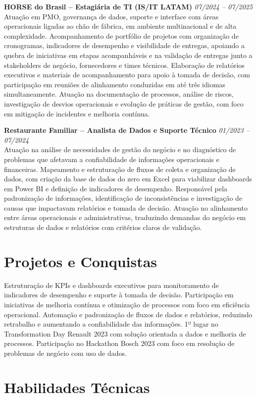 \documentclass[11pt,a4paper]{article}
\newcommand{\experience}[3]{%
  \textbf{#1} \hfill \textit{#2}\\[4pt]
  #3
  \vspace{8pt}
}
\begin{document}
\experience{HORSE do Brasil -- Estagiária de TI (IS/IT LATAM)}{07/2024 -- 07/2025}{%
Atuação em PMO, governança de dados, suporte e interface com áreas operacionais ligadas ao chão de fábrica, em ambiente multinacional e de alta complexidade. Acompanhamento de portfólio de projetos com organização de cronogramas, indicadores de desempenho e visibilidade de entregas, apoiando a quebra de iniciativas em etapas acompanháveis e na validação de entregas junto a stakeholders de negócio, fornecedores e times técnicos. Elaboração de relatórios executivos e materiais de acompanhamento para apoio à tomada de decisão, com participação em reuniões de alinhamento conduzidas em até três idiomas simultaneamente. Atuação na documentação de processos, análise de riscos, investigação de desvios operacionais e evolução de práticas de gestão, com foco em mitigação de incidentes e melhoria contínua.}

\experience{Restaurante Familiar -- Analista de Dados e Suporte Técnico}{01/2023 -- 07/2024}{%
Atuação na análise de necessidades de gestão do negócio e no diagnóstico de problemas que afetavam a confiabilidade de informações operacionais e financeiras. Mapeamento e estruturação de fluxos de coleta e organização de dados, com criação da base de dados do zero em Excel para viabilizar dashboards em Power BI e definição de indicadores de desempenho. Responsável pela padronização de informações, identificação de inconsistências e investigação de causas que impactavam relatórios e tomada de decisão. Atuação no alinhamento entre áreas operacionais e administrativas, traduzindo demandas do negócio em estruturas de dados e relatórios com critérios claros de validação.}

\section*{Projetos e Conquistas}

Estruturação de KPIs e dashboards executivos para monitoramento de indicadores de desempenho e suporte à tomada de decisão. Participação em iniciativas de melhoria contínua e otimização de processos com foco em eficiência operacional. Automação e padronização de fluxos de dados e relatórios, reduzindo retrabalho e aumentando a confiabilidade das informações. 1º lugar no Transformation Day Renault 2023 com solução orientada a dados e melhoria de processos. Participação no Hackathon Bosch 2023 com foco em resolução de problemas de negócio com uso de dados.

\section*{Habilidades Técnicas}
\end{document}
